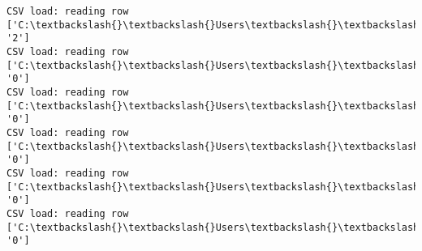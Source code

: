 \documentclass[11pt]{article}
\begin{document}
\begin{Verbatim}[commandchars=\\\{\}]
CSV load: reading row ['C:\textbackslash{}\textbackslash{}Users\textbackslash{}\textbackslash{}AbhishekGangadhar\textbackslash{}\textbackslash{}Downloads\textbackslash{}\textbackslash{}ActionRecog\textbackslash{}\textbackslash{}ActionRecog\textbackslash{}\textbackslash{}DataSets\textbackslash{}\textbackslash{}UCF11\textbackslash{}\textbackslash{}action\_youtube\_naudio\textbackslash{}\textbackslash{}trampoline\_jumping\textbackslash{}\textbackslash{}v\_jumping\_14\textbackslash{}\textbackslash{}v\_jumping\_14\_04.avi', '2']
CSV load: reading row ['C:\textbackslash{}\textbackslash{}Users\textbackslash{}\textbackslash{}AbhishekGangadhar\textbackslash{}\textbackslash{}Downloads\textbackslash{}\textbackslash{}ActionRecog\textbackslash{}\textbackslash{}ActionRecog\textbackslash{}\textbackslash{}DataSets\textbackslash{}\textbackslash{}UCF11\textbackslash{}\textbackslash{}action\_youtube\_naudio\textbackslash{}\textbackslash{}biking\textbackslash{}\textbackslash{}v\_biking\_11\textbackslash{}\textbackslash{}v\_biking\_11\_01.avi', '0']
CSV load: reading row ['C:\textbackslash{}\textbackslash{}Users\textbackslash{}\textbackslash{}AbhishekGangadhar\textbackslash{}\textbackslash{}Downloads\textbackslash{}\textbackslash{}ActionRecog\textbackslash{}\textbackslash{}ActionRecog\textbackslash{}\textbackslash{}DataSets\textbackslash{}\textbackslash{}UCF11\textbackslash{}\textbackslash{}action\_youtube\_naudio\textbackslash{}\textbackslash{}biking\textbackslash{}\textbackslash{}v\_biking\_11\textbackslash{}\textbackslash{}v\_biking\_11\_02.avi', '0']
CSV load: reading row ['C:\textbackslash{}\textbackslash{}Users\textbackslash{}\textbackslash{}AbhishekGangadhar\textbackslash{}\textbackslash{}Downloads\textbackslash{}\textbackslash{}ActionRecog\textbackslash{}\textbackslash{}ActionRecog\textbackslash{}\textbackslash{}DataSets\textbackslash{}\textbackslash{}UCF11\textbackslash{}\textbackslash{}action\_youtube\_naudio\textbackslash{}\textbackslash{}biking\textbackslash{}\textbackslash{}v\_biking\_11\textbackslash{}\textbackslash{}v\_biking\_11\_03.avi', '0']
CSV load: reading row ['C:\textbackslash{}\textbackslash{}Users\textbackslash{}\textbackslash{}AbhishekGangadhar\textbackslash{}\textbackslash{}Downloads\textbackslash{}\textbackslash{}ActionRecog\textbackslash{}\textbackslash{}ActionRecog\textbackslash{}\textbackslash{}DataSets\textbackslash{}\textbackslash{}UCF11\textbackslash{}\textbackslash{}action\_youtube\_naudio\textbackslash{}\textbackslash{}biking\textbackslash{}\textbackslash{}v\_biking\_11\textbackslash{}\textbackslash{}v\_biking\_11\_04.avi', '0']
CSV load: reading row ['C:\textbackslash{}\textbackslash{}Users\textbackslash{}\textbackslash{}AbhishekGangadhar\textbackslash{}\textbackslash{}Downloads\textbackslash{}\textbackslash{}ActionRecog\textbackslash{}\textbackslash{}ActionRecog\textbackslash{}\textbackslash{}DataSets\textbackslash{}\textbackslash{}UCF11\textbackslash{}\textbackslash{}action\_youtube\_naudio\textbackslash{}\textbackslash{}biking\textbackslash{}\textbackslash{}v\_biking\_11\textbackslash{}\textbackslash{}v\_biking\_11\_05.avi', '0']

\end{Verbatim}
\end{document}
